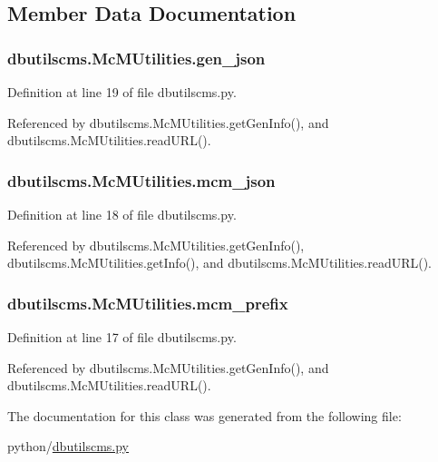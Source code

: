 \subsection{Member Data Documentation}
\subsubsection[{gen\-\_\-json}]{\setlength{\rightskip}{0pt plus 5cm}dbutilscms.\-Mc\-M\-Utilities.\-gen\-\_\-json}\label{classdbutilscms_1_1McMUtilities_a76183411bde06b86c5f069debe9de0cb}


Definition at line 19 of file dbutilscms.\-py.



Referenced by dbutilscms.\-Mc\-M\-Utilities.\-get\-Gen\-Info(), and dbutilscms.\-Mc\-M\-Utilities.\-read\-U\-R\-L().

\subsubsection[{mcm\-\_\-json}]{\setlength{\rightskip}{0pt plus 5cm}dbutilscms.\-Mc\-M\-Utilities.\-mcm\-\_\-json}\label{classdbutilscms_1_1McMUtilities_a74cae1d5e5f10e8e02d6ab01c4685df7}


Definition at line 18 of file dbutilscms.\-py.



Referenced by dbutilscms.\-Mc\-M\-Utilities.\-get\-Gen\-Info(), dbutilscms.\-Mc\-M\-Utilities.\-get\-Info(), and dbutilscms.\-Mc\-M\-Utilities.\-read\-U\-R\-L().

\subsubsection[{mcm\-\_\-prefix}]{\setlength{\rightskip}{0pt plus 5cm}dbutilscms.\-Mc\-M\-Utilities.\-mcm\-\_\-prefix}\label{classdbutilscms_1_1McMUtilities_a747bf77793d263466e34c3adb7aaa41f}


Definition at line 17 of file dbutilscms.\-py.



Referenced by dbutilscms.\-Mc\-M\-Utilities.\-get\-Gen\-Info(), and dbutilscms.\-Mc\-M\-Utilities.\-read\-U\-R\-L().



The documentation for this class was generated from the following file\-:\begin{DoxyCompactItemize}
\item 
python/\hyperlink{dbutilscms_8py}{dbutilscms.\-py}\end{DoxyCompactItemize}

